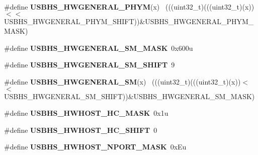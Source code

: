 \begin{DoxyCompactItemize}
\item 
\hypertarget{group___u_s_b_h_s___register___masks_gad8df14cb33388feae9f72ddf8d6946a0}{}\#define {\bfseries U\+S\+B\+H\+S\+\_\+\+H\+W\+G\+E\+N\+E\+R\+A\+L\+\_\+\+P\+H\+Y\+M}(x)                                ~(((uint32\+\_\+t)(((uint32\+\_\+t)(x))$<$$<$U\+S\+B\+H\+S\+\_\+\+H\+W\+G\+E\+N\+E\+R\+A\+L\+\_\+\+P\+H\+Y\+M\+\_\+\+S\+H\+I\+F\+T))\&U\+S\+B\+H\+S\+\_\+\+H\+W\+G\+E\+N\+E\+R\+A\+L\+\_\+\+P\+H\+Y\+M\+\_\+\+M\+A\+S\+K)\label{group___u_s_b_h_s___register___masks_gad8df14cb33388feae9f72ddf8d6946a0}

\item 
\hypertarget{group___u_s_b_h_s___register___masks_gab949d6fb8f8670c97a4caca3ec7ef75a}{}\#define {\bfseries U\+S\+B\+H\+S\+\_\+\+H\+W\+G\+E\+N\+E\+R\+A\+L\+\_\+\+S\+M\+\_\+\+M\+A\+S\+K}~0x600u\label{group___u_s_b_h_s___register___masks_gab949d6fb8f8670c97a4caca3ec7ef75a}

\item 
\hypertarget{group___u_s_b_h_s___register___masks_gab6465126c9891ce747d26fdb3a314df5}{}\#define {\bfseries U\+S\+B\+H\+S\+\_\+\+H\+W\+G\+E\+N\+E\+R\+A\+L\+\_\+\+S\+M\+\_\+\+S\+H\+I\+F\+T}~9\label{group___u_s_b_h_s___register___masks_gab6465126c9891ce747d26fdb3a314df5}

\item 
\hypertarget{group___u_s_b_h_s___register___masks_gab253da07538d2c74429a7d948b4aae5d}{}\#define {\bfseries U\+S\+B\+H\+S\+\_\+\+H\+W\+G\+E\+N\+E\+R\+A\+L\+\_\+\+S\+M}(x)                                    ~(((uint32\+\_\+t)(((uint32\+\_\+t)(x))$<$$<$U\+S\+B\+H\+S\+\_\+\+H\+W\+G\+E\+N\+E\+R\+A\+L\+\_\+\+S\+M\+\_\+\+S\+H\+I\+F\+T))\&U\+S\+B\+H\+S\+\_\+\+H\+W\+G\+E\+N\+E\+R\+A\+L\+\_\+\+S\+M\+\_\+\+M\+A\+S\+K)\label{group___u_s_b_h_s___register___masks_gab253da07538d2c74429a7d948b4aae5d}

\item 
\hypertarget{group___u_s_b_h_s___register___masks_ga1df6500358feaf91fedd8a95acd4ee73}{}\#define {\bfseries U\+S\+B\+H\+S\+\_\+\+H\+W\+H\+O\+S\+T\+\_\+\+H\+C\+\_\+\+M\+A\+S\+K}~0x1u\label{group___u_s_b_h_s___register___masks_ga1df6500358feaf91fedd8a95acd4ee73}

\item 
\hypertarget{group___u_s_b_h_s___register___masks_ga09c1ced4614938b24dbbd7d2121c3941}{}\#define {\bfseries U\+S\+B\+H\+S\+\_\+\+H\+W\+H\+O\+S\+T\+\_\+\+H\+C\+\_\+\+S\+H\+I\+F\+T}~0\label{group___u_s_b_h_s___register___masks_ga09c1ced4614938b24dbbd7d2121c3941}

\item 
\hypertarget{group___u_s_b_h_s___register___masks_gaba2e67cf7f092ab8120c89f633172a4c}{}\#define {\bfseries U\+S\+B\+H\+S\+\_\+\+H\+W\+H\+O\+S\+T\+\_\+\+N\+P\+O\+R\+T\+\_\+\+M\+A\+S\+K}~0x\+Eu\label{group___u_s_b_h_s___register___masks_gaba2e67cf7f092ab8120c89f633172a4c}


\end{DoxyCompactItemize}
